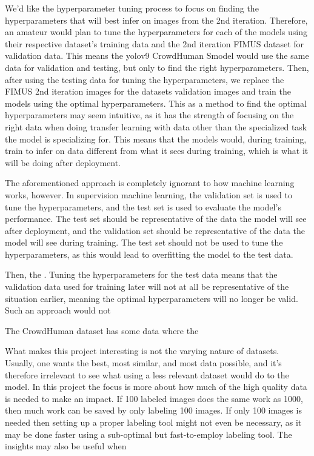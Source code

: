 We'd like the hyperparameter tuning process to focus on finding the hyperparameters that will best infer on images from the 2nd iteration. Therefore, an amateur would plan to tune the hyperparameters for each of the models using their respective dataset's training data and the 2nd iteration FIMUS dataset for validation data. This means the yolov9 CrowdHuman Smodel would use the same data for validation and testing, but only to find the right hyperparameters. Then, after using the testing data for tuning the hyperparameters, we replace the FIMUS 2nd iteration images for the datasets validation images and train the models using the optimal hyperparameters. This as a method to find the optimal hyperparameters may seem intuitive, as it has the strength of focusing on the right data when doing transfer learning with data other than the specialized task the model is specializing for. This means that the models would, during training, train to infer on data different from what it sees during training, which is what it will be doing after deployment.

The aforementioned approach is completely ignorant to how machine learning works, however. In supervision machine learning, the validation set is used to tune the hyperparameters, and the test set is used to evaluate the model's performance. The test set should be representative of the data the model will see after deployment, and the validation set should be representative of the data the model will see during training. The test set should not be used to tune the hyperparameters, as this would lead to overfitting the model to the test data.

Then, the . Tuning the hyperparameters for the test data means that the validation data used for training later will not at all be representative of the situation earlier, meaning the optimal hyperparameters will no longer be valid. Such an approach would not 


The CrowdHuman dataset has some data where the 


What makes this project interesting is not the varying nature of datasets. Usually, one wants the best, most similar, and most data possible, and it's therefore irrelevant to see what using a less relevant dataset would do to the model. In this project the focus is more about how much of the high quality data is needed to make an impact. If 100 labeled images does the same work as 1000, then much work can be saved by only labeling 100 images. If only 100 images is needed then setting up a proper labeling tool might not even be necessary, as it may be done faster using a sub-optimal but fast-to-employ labeling tool. The insights may also be useful when 


